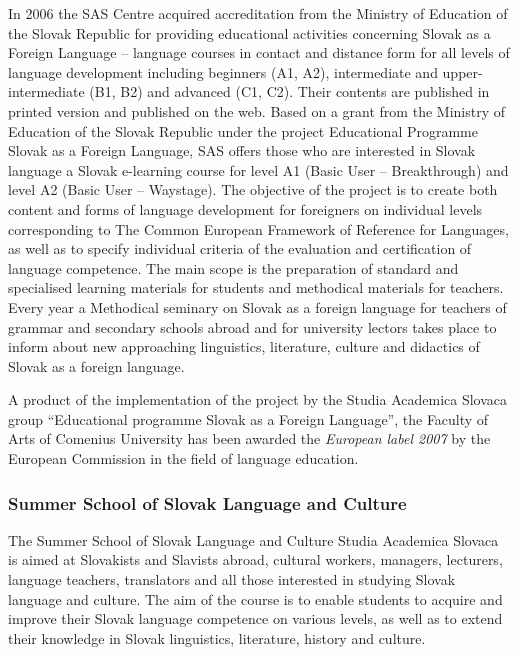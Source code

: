\begin{multicols}{2}

In 2006 the SAS Centre acquired accreditation from the Ministry of Education of the Slovak Republic for providing educational activities concerning Slovak as a Foreign Language – language courses in contact and distance form for all levels of language development including beginners (A1, A2), intermediate and upper-intermediate (B1, B2) and advanced (C1, C2). Their contents are published in printed version \cite{pekarovicova2007} and published on the web\cite{f9}.
Based on a grant from the Ministry of Education of the Slovak Republic under the project Educational Programme Slovak as a Foreign Language, SAS offers those who are interested in Slovak language a Slovak e-learning course for level A1 (Basic User – Breakthrough) and level A2 (Basic User – Waystage). The objective of the project is to create both content and forms of language development for foreigners on individual levels corresponding to The Common European Framework of Reference for Languages, as well as to specify individual criteria of the evaluation and certification of language competence. The main scope is the preparation of standard and specialised learning materials for students and methodical materials for teachers. Every year a Methodical seminary on Slovak as a foreign language for teachers of grammar and secondary schools abroad and for university lectors takes place to inform about new approaching linguistics, literature, culture and didactics of Slovak as a foreign language.

A product of the implementation of the project by the Studia Academica Slovaca group “Educational programme Slovak as a Foreign Language”, the Faculty of Arts of Comenius University has been awarded the \emph{European label 2007} by the European Commission in the field of language education. 

\subsubsection{Summer School of Slovak Language and Culture}
The Summer School of Slovak Language and Culture Studia Academica Slovaca is aimed at Slovakists and Slavists abroad, cultural workers, managers, lecturers, language teachers, translators and all those interested in studying Slovak language and culture. The aim of the course is to enable students to acquire and improve their Slovak language competence on various levels, as well as to extend their knowledge in Slovak linguistics, literature, history and culture.


\end{multicols}
